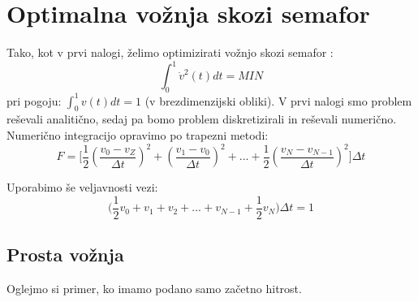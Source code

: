 \documentclass[slovene,11pt,a4paper]{article}
\numberwithin{equation}{section} %
\numberwithin{figure}{section} %
\numberwithin{table}{section} %
\begin{document}
\clearpage



\section{Optimalna vožnja skozi semafor}
Tako, kot v prvi nalogi, želimo optimizirati vožnjo skozi semafor :
\begin{equation}
\int_0^1 \dot{v}^2(t)dt =MIN
\end{equation}
pri pogoju: $\int_0^1 v(t) dt = 1$ (v brezdimenzijski obliki).
V prvi nalogi smo problem reševali analitično, sedaj pa bomo problem diskretizirali in reševali numerično.
Numerično integracijo opravimo po trapezni metodi:
\begin{equation}
F=\Bigg[ \frac{1}{2}(\frac{v_0 -v_{Z}}{\Delta t})^2+(\frac{v_1-v_0}{\Delta t})^2+...+\frac{1}{2} (\frac{v_N -v_{N-1}}{\Delta t})^2 \Bigg] \Delta t
\end{equation}

Uporabimo še veljavnosti vezi:
\begin{equation}
 \big( \frac{1}{2}v_0+v_1+v_2+...+v_{N-1}+\frac{1}{2}v_N \big) \Delta t=1
\end{equation}

\subsection{Prosta vožnja}
Oglejmo si primer, ko imamo podano samo začetno hitrost.
\end{document}
